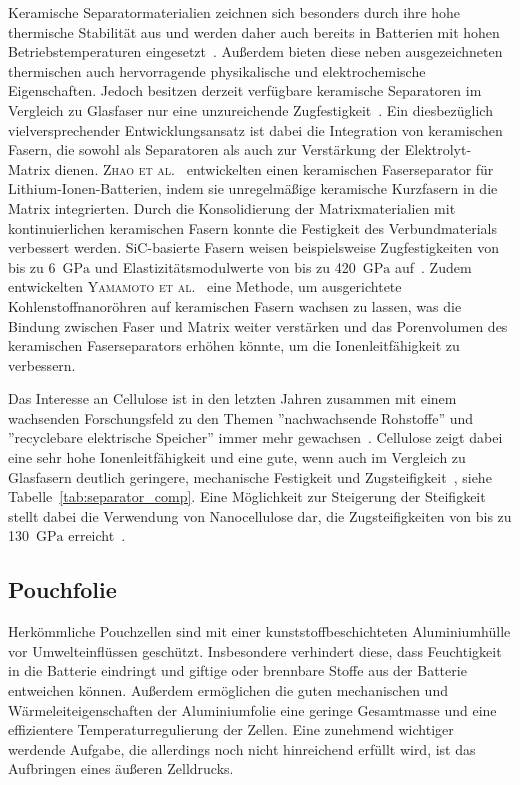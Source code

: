 Keramische Separatormaterialien zeichnen sich besonders durch ihre hohe thermische Stabilität aus und werden daher auch bereits in Batterien mit hohen Betriebstemperaturen eingesetzt~\cite{Qin2017,Cheong2012}. Außerdem bieten diese neben ausgezeichneten thermischen auch hervorragende physikalische und elektrochemische Eigenschaften. Jedoch besitzen derzeit verfügbare keramische Separatoren im Vergleich zu Glasfaser nur eine unzureichende Zugfestigkeit~\cite{Qin2017}. Ein diesbezüglich vielversprechender Entwicklungsansatz ist dabei die Integration von keramischen Fasern, die sowohl als Separatoren als auch zur Verstärkung der Elektrolyt-Matrix dienen. \textsc{Zhao et al.}~\cite{Zhao2017} entwickelten einen keramischen Faserseparator für Lithium-Ionen-Batterien, indem sie unregelmäßige keramische Kurzfasern in die Matrix integrierten. Durch die Konsolidierung der Matrixmaterialien mit kontinuierlichen keramischen Fasern konnte die Festigkeit des Verbundmaterials verbessert werden. SiC-basierte Fasern weisen beispielsweise Zugfestigkeiten von bis zu 6~$\si{\GPa}$ und Elastizitätsmodulwerte von bis zu 420~$\si{\GPa}$ auf~\cite{Seydibeyoglu2017}. Zudem entwickelten \textsc{Yamamoto et al.}~\cite{Yamamoto2009} eine Methode, um ausgerichtete Kohlenstoffnanoröhren auf keramischen Fasern wachsen zu lassen, was die Bindung zwischen Faser und Matrix weiter verstärken und das Porenvolumen des keramischen Faserseparators erhöhen könnte, um die Ionenleitfähigkeit zu verbessern.

Das Interesse an Cellulose ist in den letzten Jahren zusammen mit einem wachsenden Forschungsfeld zu den Themen ''nachwachsende Rohstoffe'' und ''recyclebare elektrische Speicher'' immer mehr gewachsen~\cite{Liang2018,Teng2020}. Cellulose zeigt dabei eine sehr hohe Ionenleitfähigkeit und eine gute, wenn auch im Vergleich zu Glasfasern deutlich geringere, mechanische Festigkeit und Zugsteifigkeit~\cite{Xu2020}, siehe Tabelle~\ref{tab:separator_comp}. Eine Möglichkeit zur Steigerung der Steifigkeit stellt dabei die Verwendung von Nanocellulose dar, die Zugsteifigkeiten von bis zu 130~$\si{\GPa}$ erreicht~\cite{Dufresne2013,Zhang2019}.

\subsection{Pouchfolie}
Herkömmliche Pouchzellen sind mit einer kunststoffbeschichteten Aluminiumhülle vor Umwelteinflüssen geschützt. Insbesondere verhindert diese, dass Feuchtigkeit in die Batterie eindringt und giftige oder brennbare Stoffe aus der Batterie entweichen können. Außerdem ermöglichen die guten mechanischen und Wärmeleiteigenschaften der Aluminiumfolie eine geringe Gesamtmasse und eine effizientere Temperaturregulierung der Zellen. Eine zunehmend wichtiger werdende Aufgabe, die allerdings noch nicht hinreichend erfüllt wird, ist das Aufbringen eines äußeren Zelldrucks.

